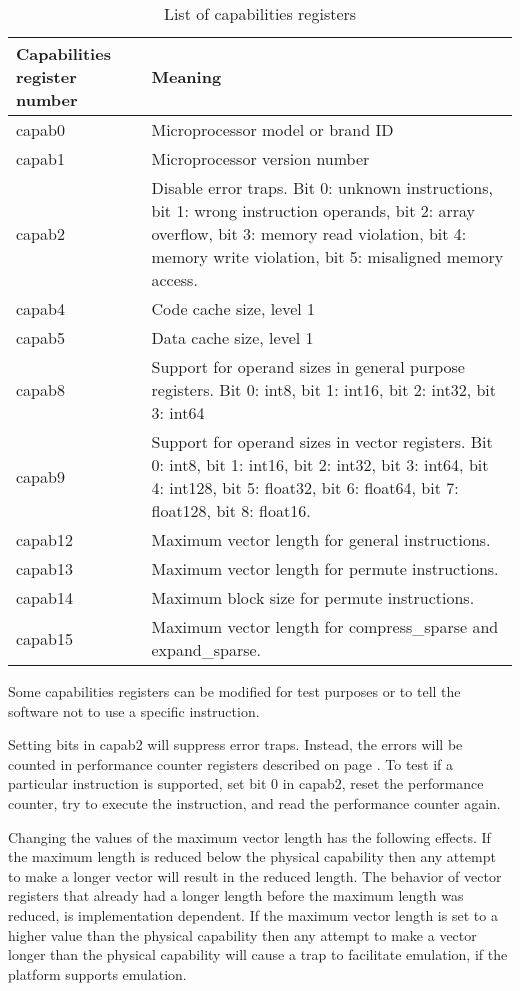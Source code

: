 \documentclass[forwardcom.tex]{subfiles}
\begin{document}
\begin{longtable} {|p{20mm}|p{90mm}|}
\caption{List of capabilities registers} 
\label{table:capabilitiesRegisters} \\
\endfirsthead
\endhead
\hline
\bfseries Capabilities register number & \bfseries Meaning  \\
\hline
capab0 & Microprocessor model or brand ID  \\
capab1 & Microprocessor version number  \\
\hline
capab2 & Disable error traps. Bit 0: unknown instructions, bit 1: wrong instruction operands, bit 2: array overflow, bit 3: memory read violation, bit 4: memory write violation, bit 5: misaligned memory access. \\
\hline
capab4 & Code cache size, level 1  \\
capab5 & Data cache size, level 1  \\
\hline
capab8  &  Support for operand sizes in general purpose registers. Bit 0: int8, bit 1: int16, bit 2: int32, bit 3: int64 \\
capab9  &  Support for operand sizes in vector registers. \linebreak
Bit 0: int8, bit 1: int16, bit 2: int32, bit 3: int64, bit 4: int128, bit 5: float32, bit 6: float64, bit 7: float128, bit 8: float16.\\
\hline

capab12  &  Maximum vector length for general instructions. \\
capab13  &  Maximum vector length for permute instructions. \\
capab14  &  Maximum block size for permute instructions. \\
capab15  &  Maximum vector length for compress\_sparse and expand\_sparse. \\
\hline

\hline
\end{longtable}

Some capabilities registers can be modified for test purposes or to tell the software not to use a specific instruction.
\vv

Setting bits in capab2 will suppress error traps. Instead, the errors will be counted in performance counter registers described on page \pageref{table:performanceCounters}. To test if a particular instruction is supported, set bit 0 in capab2, reset the performance counter, try to execute the instruction, and read the performance counter again.

\vv
Changing the values of the maximum vector length has the following effects. If the maximum length is reduced below the physical capability then any attempt to make a longer vector will result in the reduced length. The behavior of vector registers that already had a longer length before the maximum length was reduced, is implementation dependent. If the maximum vector length is set to a higher value than the physical capability then any attempt to make a vector longer than the physical capability will cause a trap to facilitate emulation, if the platform supports emulation. 
\vv
\end{document}
